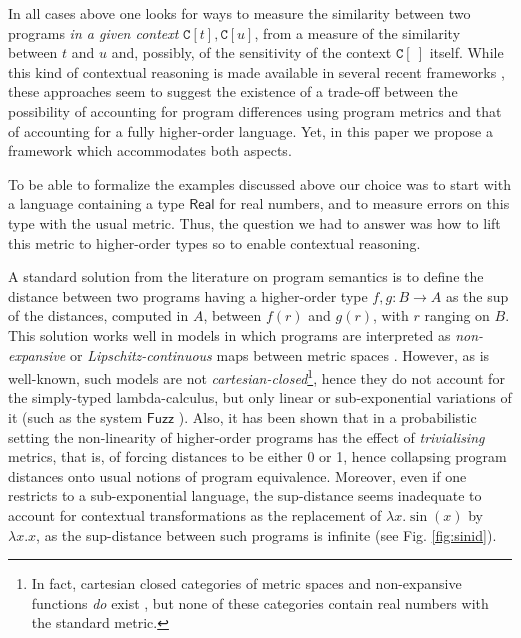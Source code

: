  In all cases above one looks for ways to measure the similarity between two programs \emph{in a given context} $\mathtt C[t], \mathtt C[u]$, from a measure of the similarity between $t$ and $u$ and, possibly, of the sensitivity of the context $\mathtt C[\ ]$ itself.  
  While this kind of contextual reasoning is made available in several recent frameworks \cite{10.1145/1932681.1863568,Gaboardi_2013,Azevedo_de_Amorim_2017,chaudhuri, dallago:differential-stlc},  these approaches seem to suggest the existence of a trade-off between the possibility of accounting for 
program differences using program metrics and that of accounting for  a fully higher-order language. Yet, in this paper we propose a framework which accommodates both aspects. 

%




To be able to formalize the examples discussed above our choice was to start with a language containing a type $\mathsf{Real}$ for real numbers, and to measure errors on this type with the usual metric. Thus, the question we had to answer was how to lift this metric to higher-order types so to enable contextual reasoning.



A standard solution from the literature on program semantics is to define the distance between two programs having a higher-order type $f,g:B\to A$ as the sup of the distances, computed in $A$, between $f(r)$ and $g(r)$, with $r$ ranging on $B$.
This solution works well in models in which programs are interpreted as \emph{non-expansive} or \emph{Lipschitz-continuous} maps between metric spaces \cite{}. However, as is well-known, such models are not \emph{cartesian-closed}\footnote{In fact, cartesian closed categories of metric spaces and non-expansive functions \emph{do} exist \cite{}, but none of these categories contain real numbers with the standard metric.}, hence they do not account for 
 the simply-typed lambda-calculus, but only linear or sub-exponential variations of it (such as the system $\mathsf{Fuzz}$ \cite{10.1145/1932681.1863568,Gaboardi_2013,Azevedo_de_Amorim_2017}).
 Also, it has been shown \cite{10.1109/LICS.2015.64} that in a probabilistic setting the non-linearity of higher-order programs has the effect of \emph{trivialising} metrics, that is, of forcing distances to be either 0 or 1, hence collapsing program distances onto usual notions of program equivalence.
Moreover, even if one restricts to a sub-exponential language, the sup-distance seems inadequate to account for contextual transformations as the replacement of $\lambda x.\sin(x)$ by $\lambda x.x$,  as the sup-distance between such programs is infinite (see Fig. \ref{fig:sinid}). 
 
